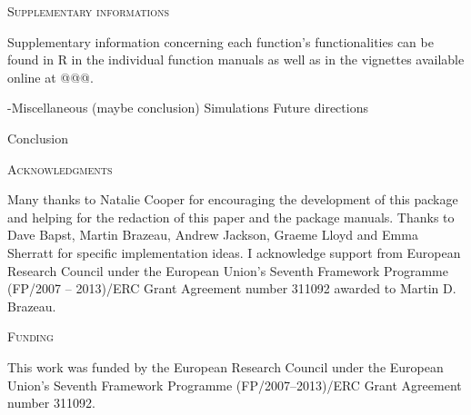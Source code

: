 \documentclass[12pt,letterpaper]{article}
\renewcommand{\section}[1]{%
\bigskip
\begin{center}
\begin{Large}
\normalfont\scshape #1
\medskip
\end{Large}
\end{center}}
\begin{document}











\section{Supplementary informations}
Supplementary information concerning each function's functionalities can be found in R in the individual function manuals as well as in the vignettes available online at @@@.


-Miscellaneous (maybe conclusion)
Simulations
Future directions




Conclusion



\section{Acknowledgments}
Many thanks to Natalie Cooper for encouraging the development of this package and helping for the redaction of this paper and the package manuals.
Thanks to Dave Bapst, Martin Brazeau, Andrew Jackson, Graeme Lloyd and Emma Sherratt for specific implementation ideas.
I acknowledge support from European Research Council under the European Union's Seventh Framework Programme (FP/2007 – 2013)/ERC Grant Agreement number 311092 awarded to Martin D. Brazeau.

\section{Funding}
This work was funded by the European Research Council under the European Union's Seventh Framework Programme (FP/2007–2013)/ERC Grant Agreement number 311092.



\end{document}
